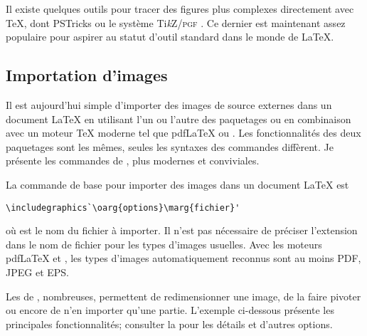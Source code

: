 Il existe quelques outils pour tracer des figures plus complexes
directement avec {\TeX}, dont PSTricks \citep{pstricks}
ou le système Ti\emph{k}Z/\textsc{pgf} \citep{tikz}.
Ce dernier est maintenant assez populaire pour aspirer au statut
d'outil standard dans le monde de {\LaTeX}.


\subsection{Importation d'images}
\label{sec:tableaux:figures:graphics}

Il est aujourd'hui simple d'importer des images de source externes
dans un document {\LaTeX} en utilisant l'un ou l'autre des paquetages
 ou  \citep{graphicx} en combinaison avec
un moteur {\TeX} moderne tel que pdf{\LaTeX} ou {\XeLaTeX}. Les
fonctionnalités des deux paquetages sont les mêmes, seules les
syntaxes des commandes diffèrent. Je présente les commandes de
, plus modernes et conviviales.

La commande de base pour importer des images dans un document {\LaTeX} est
\begin{lstlisting}
\includegraphics`\oarg{options}\marg{fichier}'
\end{lstlisting}
où  est le nom du fichier à importer. Il n'est pas
nécessaire de préciser l'extension dans le nom de fichier pour les
types d'images usuelles. Avec les moteurs pdf{\LaTeX} et {\XeLaTeX},
les types d'images automatiquement reconnus sont au moins PDF, JPEG et
EPS.

Les  de , nombreuses, permettent
de redimensionner une image, de la faire pivoter ou encore de n'en
importer qu'une partie. L'exemple ci-dessous présente les principales
fonctionnalités; consulter la %
pour les détails et d'autres options.

